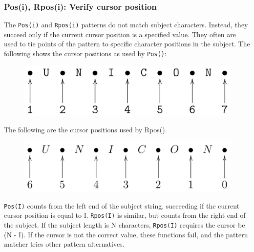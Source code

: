 \documentclass[letterpaper,12pt]{article}
\begin{document}
\subsubsection{Pos(i), Rpos(i): Verify cursor position}

The {\tt Pos(i)} and {\tt Rpos(i)} patterns do not match subject
characters. Instead, they succeed only if the current cursor position
is a specified value. They often are used to tie points of the pattern
to specific character positions in the subject. The following shows
the cursor positions as used by {\tt Pos()}:

\begin{figure}[h]
\centering
\includegraphics[width=5in]{poscurs.png}
\end{figure}

The following are the cursor positions used by Rpos().

\begin{figure}[h]
\centering
\includegraphics[width=5in]{rposcurs.png}
\end{figure}


{\tt Pos(I)} counts from the left end of the subject string, succeeding if
the current cursor position is equal to I. {\tt Rpos(I)} is similar, but
counts from the right end of the subject. If the subject length is N
characters, {\tt Rpos(I)} requires the cursor be (N - I). If the cursor is
not the correct value, these functions fail, and the pattern matcher
tries other pattern alternatives.
\end{document}

